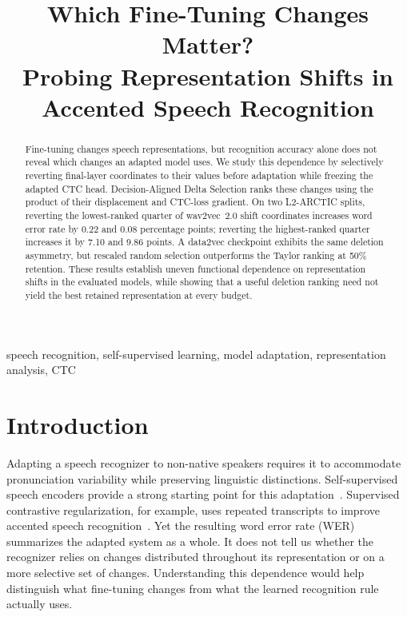 \documentclass{article}
\title{Which Fine-Tuning Changes Matter?\\Probing Representation Shifts in Accented Speech Recognition}
\begin{document}
\maketitle

\begin{abstract}
Fine-tuning changes speech representations, but recognition accuracy alone does not reveal which changes an adapted model uses. We study this dependence by selectively reverting final-layer coordinates to their values before adaptation while freezing the adapted CTC head. Decision-Aligned Delta Selection ranks these changes using the product of their displacement and CTC-loss gradient. On two L2-ARCTIC splits, reverting the lowest-ranked quarter of wav2vec~2.0 shift coordinates increases word error rate by 0.22 and 0.08 percentage points; reverting the highest-ranked quarter increases it by 7.10 and 9.86 points. A data2vec checkpoint exhibits the same deletion asymmetry, but rescaled random selection outperforms the Taylor ranking at 50\% retention. These results establish uneven functional dependence on representation shifts in the evaluated models, while showing that a useful deletion ranking need not yield the best retained representation at every budget.
\end{abstract}

\begin{keywords}
speech recognition, self-supervised learning, model adaptation, representation analysis, CTC
\end{keywords}

\section{Introduction}
\label{sec:intro}
Adapting a speech recognizer to non-native speakers requires it to accommodate pronunciation variability while preserving linguistic distinctions. Self-supervised speech encoders provide a strong starting point for this adaptation~\cite{baevski2020wav2vec,baevski2022data2vec}. Supervised contrastive regularization, for example, uses repeated transcripts to improve accented speech recognition~\cite{thai2026contrastive}. Yet the resulting word error rate (WER) summarizes the adapted system as a whole. It does not tell us whether the recognizer relies on changes distributed throughout its representation or on a more selective set of changes. Understanding this dependence would help distinguish what fine-tuning changes from what the learned recognition rule actually uses.
\end{document}
